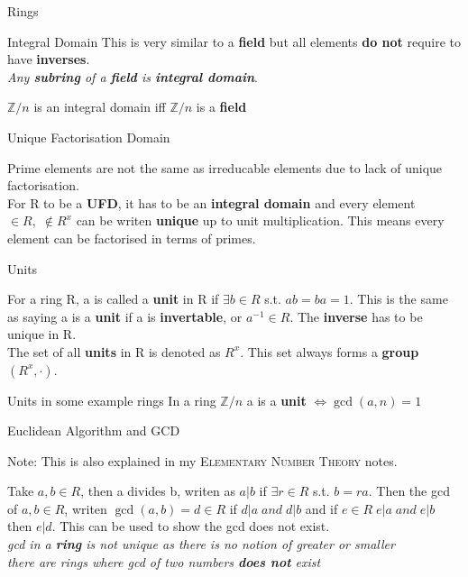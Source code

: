 \documentclass[12pt, letterpaper]{article}
\begin{document}
\begin{section}{Rings}
\begin{subsection}{Integral Domain}
    This is very similar to a \textbf{field} but all elements \textbf{do not}
    require to have \textbf{inverses}. \\
    \emph{Any \textbf{subring} of a \textbf{field} is \textbf{integral domain}}.

    \(\mathbb{Z}/n\) is an integral domain iff \(\mathbb{Z}/n\) is a \textbf{field}

  \end{subsection}

  \begin{subsection}{Unique Factorisation Domain}

    Prime elements are not the same as irreducable elements due to lack of unique
    factorisation. \\
    For R to be a \textbf{UFD}, it has to be an \textbf{integral domain} and
    every element \(\in R, \; \not \in R^{x}\) can be writen \textbf{unique} up
    to unit multiplication. This means every element can be factorised in terms
    of primes.

  \end{subsection}

  \begin{subsection}{Units}

    For a ring R, a is called a \textbf{unit} in R if \(\exists b \in R\) s.t.
    \(ab = ba = 1\). This is the same as saying a is a \textbf{unit} if a is
    \textbf{invertable}, or \(a^{-1} \in R\). The \textbf{inverse} has to be
    unique in R. \\
    The set of all \textbf{units} in R is denoted as \(R^{x}\). This set always
    forms a \textbf{group} \((R^{x}, \cdot)\).

    \begin{subsubsection}{Units in some example rings}
      In a ring \(\mathbb{Z} / n\) a is a \textbf{unit} \(\iff \gcd(a, n) = 1\)
    \end{subsubsection}

  \end{subsection}

  \begin{subsection}{Euclidean Algorithm and GCD}

    Note: This is also explained in my \textsc{Elementary Number Theory} notes.

    Take \(a, b \in R\), then a divides b, writen as \(a|b\) if \(\exists r \in R\)
    s.t. \(b = ra\). Then the gcd of \(a, b \in R\), writen \(\gcd(a, b) = d \in R\) if
    \(d|a \; and \; d|b\) and if \(e \in R \; e|a \; and \; e|b\) then \(e|d\).
    This can be used to show the gcd does not exist.\\
    \emph{gcd in a \textbf{ring} is not unique as there is no notion of greater or smaller} \\
    \emph{there are rings where gcd of two numbers \textbf{does not} exist} \\


\end{subsection}
\end{section}
\end{document}
